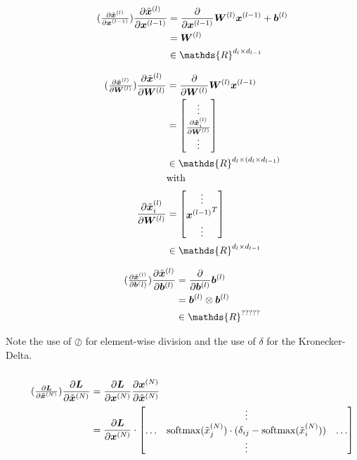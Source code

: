 \documentclass{article}
\newcommand\bM[1]{\ensuremath{\begin{bmatrix}#1\end{bmatrix}}}
\newcommand\·{\ensuremath{\cdot}}
\newcommand\…{\ensuremath{\ldots}}
\renewcommand\t{\ensuremath{\times}}
\newcommand\pf[2]{\ensuremath{\frac{\partial {#1}}{\partial {#2}}}}
\newcommand*{\B}[1]{\ifmmode\bm{#1}\else\textbf{#1}\fi}
\newcommand\1{\ensuremath{\mathds{1}}}
\newcommand\R{\ensuremath{\mathds{R}}}
\begin{document}
\begin{align*}
  \tag{$\pf{\tilde{\B{x}}^{(l)}}{\B{x}^{(l-1)}}$}
  \pf{\tilde{\B{x}}^{(l)}}{\B{x}^{(l-1)}}
  &= \pf{}{\B{x}^{(l-1)}} \B{W}^{(l)}\B{x}^{(l-1)} + \B{b}^{(l)}\\
  &=\B{W}^{(l)}\\
  &\in\R^{d_l\t d_{l-1}}
\end{align*}

\begin{align*}
  \tag{$\pf{\tilde{\B{x}}^{(l)}}{\B{W}^{(l)}}$}
  \pf{\tilde{\B{x}}^{(l)}}{\B{W}^{(l)}}
  &= \pf{}{\B{W}^{(l)}}\B{W}^{(l)}\B{x}^{(l-1)}\\
  &= \bM{\vdots\\\pf{\tilde{\B{x}}^{(l)}_i}{\B{W}^{(l)}}\\\vdots}\\
  &\in\R^{d_l\t (d_l\t d_{l-1})}\\
  &\text{with}\\
  \pf{\tilde{\B{x}}^{(l)}_i}{\B{W}^{(l)}}
  &= \bM{\vdots\\{\B{x}^{(l-1)}}^T\\\vdots}\\
  &\in\R^{d_l\t d_{l-1}}
\end{align*}

\begin{align*}
  \tag{$\pf{\tilde{\B{x}}^{(l)}}{\B{b}^(l)}$}
  \pf{\tilde{\B{x}}^{(l)}}{\B{b}^{(l)}}
  &= \pf{}{\B{b}^{(l)}}\B{b}^{(l)}\\
  &= \B{b}^{(l)} \otimes \B{b}^{(l)}\\
  &\in\R^{?????}
\end{align*}

Note the use of $\oslash$ for element-wise division and the use of $\delta$ for the Kronecker-Delta.

\subsubsection{}
\begin{align*}
  \tag{$\pf{\B{L}}{\tilde{\B{x}}^{(N)}}$}
  \pf{\B{L}}{\tilde{\B{x}}^{(N)}}
  &= \pf{\B{L}}{\B{x}^{(N)}}\pf{\B{x}^{(N)}}{\tilde{\B{x}}^{(N)}}\\
  &= \pf{\B{L}}{\B{x}^{(N)}}\·\bM{& \vdots &\\\hdots & \text{softmax}(\tilde{x}^{(N)}_j)\·(\delta_{ij} - \text{softmax}(\tilde{x}^{(N)}_i)) & \hdots\\ & \vdots &}
\end{align*}
\end{document}
